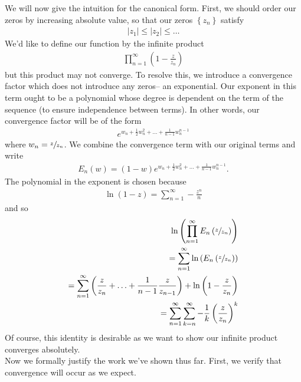 \documentclass{memoir}
\begin{document}
We will now give the intuition for the canonical form.
First, we should order our zeros by increasing absolute value, so that our zeros \(\left\{ z_n \right\} \) satisfy
\begin{align*}
	\left| z_1 \right| \leq \left| z_2 \right| \leq \ldots
\end{align*}
We'd like to define our function by the infinite product
\begin{align*}
	\prod_{n=1}^{\infty} \left( 1 - \frac{z}{z_n} \right)  
\end{align*}
but this product may not converge.
To resolve this, we introduce a convergence factor which does not introduce any zeros-- an exponential.
Our exponent in this term ought to be a polynomial whose degree is dependent on the term of the sequence (to ensure independence between terms).
In other words, our convergence factor will be of the form
\begin{align*}
	e^{w_n + \frac{1}{2}w_n^2 + \ldots + \frac{1}{n-1}w_n^{n-1}}
\end{align*}
where \(w_n = \sfrac{z}{z_n}\). We combine the convergence term with our original terms and write
\begin{align*}
	E_n(w) = (1-w) e^{w_n + \frac{1}{2}w_n^2 + \ldots + \frac{1}{n-1}w_n^{n-1}}.
\end{align*}
The polynomial in the exponent is chosen because
\begin{align*}
	\ln(1-z) = \sum_{n=1}^{\infty} -\frac{z^{n}}{n}
\end{align*}
and so
\begin{align*}
	\ln \left( \prod_{n=1}^{\infty} E_n\left(\sfrac{z}{z_n}\right)  \right)\\
	= \sum_{n=1}^{\infty} \ln \left(E_n\left(\sfrac{z}{z_n}\right) \right)\\
	= \sum_{n=1}^{\infty} \left( \frac{z}{z_n} + \ldots + \frac{1}{n-1}\frac{z}{z_{n-1}} \right) + \ln \left( 1 - \frac{z}{z_n}\right) \\
	= \sum_{n=1}^{\infty} \sum_{k=n}^{\infty} - \frac{1}{k} \left( \frac{z}{z_n} \right)^{k} 
\end{align*}
Of course, this identity is desirable as we want to show our infinite product converges absolutely.\\

Now we formally justify the work we've shown thus far.
First, we verify that convergence will occur as we expect.
\end{document}
